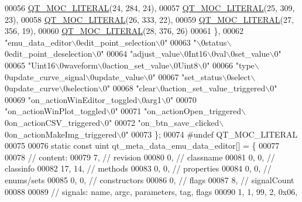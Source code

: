 \begin{DoxyCode}
00056 \hyperlink{a00014_a75bb9482d242cde0a06c9dbdc6b83abe}{QT\_MOC\_LITERAL}(24, 284, 24),
00057 \hyperlink{a00014_a75bb9482d242cde0a06c9dbdc6b83abe}{QT\_MOC\_LITERAL}(25, 309, 23),
00058 \hyperlink{a00014_a75bb9482d242cde0a06c9dbdc6b83abe}{QT\_MOC\_LITERAL}(26, 333, 22),
00059 \hyperlink{a00014_a75bb9482d242cde0a06c9dbdc6b83abe}{QT\_MOC\_LITERAL}(27, 356, 19),
00060 \hyperlink{a00014_a75bb9482d242cde0a06c9dbdc6b83abe}{QT\_MOC\_LITERAL}(28, 376, 26)
00061     \},
00062     \textcolor{stringliteral}{"emu\_data\_editor\(\backslash\)0edit\_point\_selection\(\backslash\)0"}
00063     \textcolor{stringliteral}{"\(\backslash\)0status\(\backslash\)0edit\_point\_deselection\(\backslash\)0"}
00064     \textcolor{stringliteral}{"adjust\_value\(\backslash\)0Int16\(\backslash\)0val\(\backslash\)0set\_value\(\backslash\)0"}
00065     \textcolor{stringliteral}{"Uint16\(\backslash\)0waveform\(\backslash\)0action\_set\_value\(\backslash\)0Uint8\(\backslash\)0"}
00066     \textcolor{stringliteral}{"type\(\backslash\)0update\_curve\_signal\(\backslash\)0update\_value\(\backslash\)0"}
00067     \textcolor{stringliteral}{"set\_status\(\backslash\)0select\(\backslash\)0update\_curve\(\backslash\)0selection\(\backslash\)0"}
00068     \textcolor{stringliteral}{"clear\(\backslash\)0action\_set\_value\_triggered\(\backslash\)0"}
00069     \textcolor{stringliteral}{"on\_actionWinEditor\_toggled\(\backslash\)0arg1\(\backslash\)0"}
00070     \textcolor{stringliteral}{"on\_actionWinPlot\_toggled\(\backslash\)0"}
00071     \textcolor{stringliteral}{"on\_actionOpen\_triggered\(\backslash\)0on\_actionCSV\_triggered\(\backslash\)0"}
00072     \textcolor{stringliteral}{"on\_btn\_save\_clicked\(\backslash\)0on\_actionMakeImg\_triggered\(\backslash\)0"}
00073 \};
00074 \textcolor{preprocessor}{#undef QT\_MOC\_LITERAL}
00075 
00076 \textcolor{keyword}{static} \textcolor{keyword}{const} uint qt\_meta\_data\_emu\_data\_editor[] = \{
00077 
00078  \textcolor{comment}{// content:}
00079        7,       \textcolor{comment}{// revision}
00080        0,       \textcolor{comment}{// classname}
00081        0,    0, \textcolor{comment}{// classinfo}
00082       17,   14, \textcolor{comment}{// methods}
00083        0,    0, \textcolor{comment}{// properties}
00084        0,    0, \textcolor{comment}{// enums/sets}
00085        0,    0, \textcolor{comment}{// constructors}
00086        0,       \textcolor{comment}{// flags}
00087        8,       \textcolor{comment}{// signalCount}
00088 
00089  \textcolor{comment}{// signals: name, argc, parameters, tag, flags}
00090        1,    1,   99,    2, 0x06,

\end{DoxyCode}
